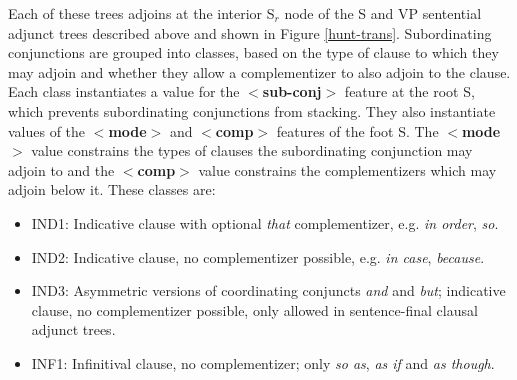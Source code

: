 Each of these trees adjoins at the interior S$_r$ node of the S and VP
sentential adjunct trees described above and shown in Figure \ref{hunt-trans}.
Subordinating conjunctions are grouped into classes, based on the type of
clause to which they may adjoin and whether they allow a complementizer to also
adjoin to the clause.  Each class instantiates a value for the {\bf
$<$sub-conj$>$} feature at the root S, which prevents subordinating
conjunctions from stacking.  They also instantiate values of the {\bf
$<$mode$>$} and {\bf $<$comp$>$} features of the foot S.  The {\bf $<$mode$>$}
value constrains the types of clauses the subordinating conjunction may adjoin
to and the {\bf $<$comp$>$} value constrains the complementizers which may
adjoin below it.  These classes are:

\begin{itemize}
\item IND1: Indicative clause with optional {\it that} complementizer,
e.g. {\it in order}, {\it so}.
\hspace{0.5in} %

\item IND2: Indicative clause, no complementizer possible, e.g. {\it
in case}, {\it because}.
\hspace{0.5in} %
\hspace{0.5in} %

\item IND3: Asymmetric versions of coordinating conjuncts {\it and}
and {\it but}; indicative clause, no complementizer possible, only
allowed in sentence-final clausal adjunct trees.
\hspace{0.5in} %
\hspace{0.5in}  %

\item INF1: Infinitival clause, no complementizer; only {\it so as}, {\it
as if} and {\it as though}.
\hspace{0.5in} %
\hspace{0.5in} %


\end{itemize}
